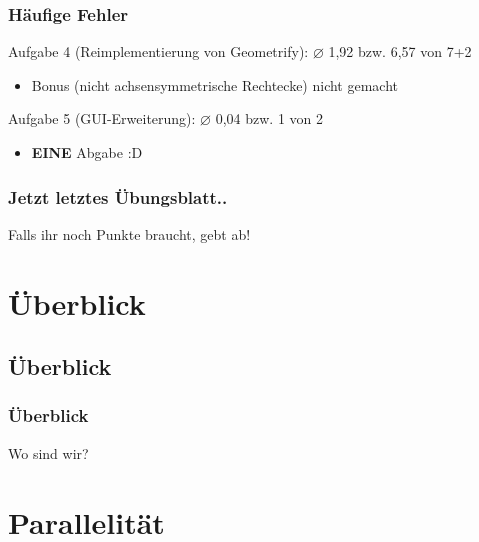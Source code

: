 \documentclass[18pt]{beamer}
\begin{document}
	\begin{frame}
		\frametitle{Häufige Fehler}
		\begin{block}{Aufgabe 4 (Reimplementierung von Geometrify): $\diameter$ 1,92 bzw. 6,57 von 7+2}
			\begin{itemize}
				\pause
				\item Bonus (nicht achsensymmetrische Rechtecke) nicht gemacht
			\end{itemize}
		\end{block}
		\pause
		\begin{block}{Aufgabe 5 (GUI-Erweiterung): $\diameter$ 0,04 bzw. 1 von 2}
			\begin{itemize}
				\item \textbf{EINE} Abgabe :D
			\end{itemize}
		\end{block}
	\end{frame}

	\begin{frame}
		\frametitle{Jetzt letztes Übungsblatt..}
		\begin{huge}
			Falls ihr noch Punkte braucht, gebt ab!
		\end{huge}
\end{frame}

\section{Überblick}
	\subsection{Überblick}
	\begin{frame}
		\frametitle{Überblick}
		\begin{huge}
			Wo sind wir?
		\end{huge}
	\end{frame}
	
	
	
\section{Parallelität}
	\subsection{}	
	
\end{document}
